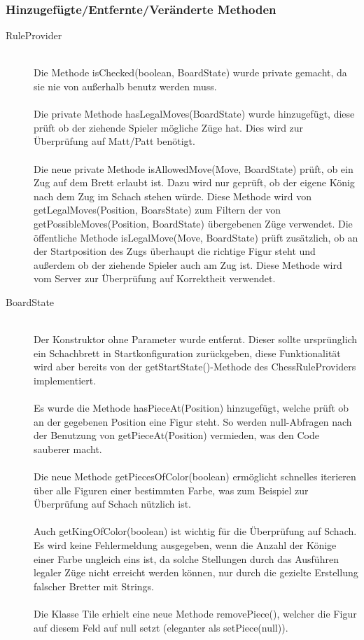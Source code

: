 \documentclass[parskip=full]{scrartcl}
\begin{document}
		\subsubsection{Hinzugefügte/Entfernte/Veränderte Methoden}
		\begin{description}
		\item[RuleProvider]\hfill \\ Die Methode isChecked(boolean, BoardState) wurde private gemacht, da sie nie von außerhalb benutz werden muss. \\
		\\
		Die private Methode hasLegalMoves(BoardState) wurde hinzugefügt, diese prüft ob der ziehende Spieler mögliche Züge hat. Dies wird zur Überprüfung auf Matt/Patt benötigt.\\
		\\
		Die neue private Methode isAllowedMove(Move, BoardState) prüft, ob ein Zug auf dem Brett erlaubt ist. Dazu wird nur geprüft, ob der eigene König nach dem Zug im Schach stehen würde. Diese Methode wird von getLegalMoves(Position, BoarsState) zum Filtern der von getPossibleMoves(Position, BoardState) übergebenen Züge verwendet. Die öffentliche Methode isLegalMove(Move, BoardState) prüft zusätzlich, ob an der Startposition des Zugs überhaupt die richtige Figur steht und außerdem ob der ziehende Spieler auch am Zug ist. Diese Methode wird vom Server zur Überprüfung auf Korrektheit verwendet.
		
		\item[BoardState]\hfill \\ Der Konstruktor ohne Parameter wurde entfernt. Dieser sollte ursprünglich ein Schachbrett in Startkonfiguration zurückgeben, diese Funktionalität wird aber bereits von der getStartState()-Methode des ChessRuleProviders implementiert. \\
		\\
		Es wurde die Methode hasPieceAt(Position) hinzugefügt, welche prüft ob an der gegebenen Position eine Figur steht. So werden null-Abfragen nach der Benutzung von getPieceAt(Position) vermieden, was den Code sauberer macht.\\
		\\
		Die neue Methode getPiecesOfColor(boolean) ermöglicht schnelles iterieren über alle Figuren einer bestimmten Farbe, was zum Beispiel zur Überprüfung auf Schach nützlich ist.\\
		\\
		Auch getKingOfColor(boolean) ist wichtig für die Überprüfung auf Schach. Es wird keine Fehlermeldung ausgegeben, wenn die Anzahl der Könige einer Farbe ungleich eins ist, da solche Stellungen durch das Ausführen legaler Züge nicht erreicht werden können, nur durch die gezielte Erstellung falscher Bretter mit Strings.\\
		\\
		Die Klasse Tile erhielt eine neue Methode removePiece(), welcher die Figur auf diesem Feld auf null setzt (eleganter als setPiece(null)).
		

\end{description}
\end{document}
